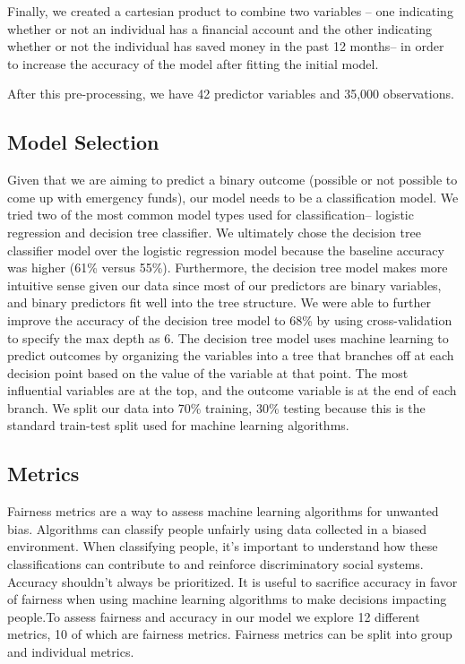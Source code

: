 \documentclass[water,article,submit,moreauthors,pdftex]{mdpi}
\begin{document}
Finally, we created a cartesian product to combine two variables -- one
indicating whether or not an individual has a financial account and the
other indicating whether or not the individual has saved money in the
past 12 months-- in order to increase the accuracy of the model after
fitting the initial model.

After this pre-processing, we have 42 predictor variables and 35,000
observations.

\hypertarget{model-selection}{%
\subsection{Model Selection}\label{model-selection}}

Given that we are aiming to predict a binary outcome (possible or not
possible to come up with emergency funds), our model needs to be a
classification model. We tried two of the most common model types used
for classification-- logistic regression and decision tree classifier.
We ultimately chose the decision tree classifier model over the logistic
regression model because the baseline accuracy was higher (61\% versus
55\%). Furthermore, the decision tree model makes more intuitive sense
given our data since most of our predictors are binary variables, and
binary predictors fit well into the tree structure. We were able to
further improve the accuracy of the decision tree model to 68\% by using
cross-validation to specify the max depth as 6. The decision tree model
uses machine learning to predict outcomes by organizing the variables
into a tree that branches off at each decision point based on the value
of the variable at that point. The most influential variables are at the
top, and the outcome variable is at the end of each branch. We split our
data into 70\% training, 30\% testing because this is the standard
train-test split used for machine learning algorithms.

\hypertarget{metrics}{%
\subsection{Metrics}\label{metrics}}

Fairness metrics are a way to assess machine learning algorithms for
unwanted bias. Algorithms can classify people unfairly using data
collected in a biased environment. When classifying people, it's
important to understand how these classifications can contribute to and
reinforce discriminatory social systems. Accuracy shouldn't always be
prioritized. It is useful to sacrifice accuracy in favor of fairness
when using machine learning algorithms to make decisions impacting
people.To assess fairness and accuracy in our model we explore 12
different metrics, 10 of which are fairness metrics. Fairness metrics
can be split into group and individual metrics.
\end{document}
